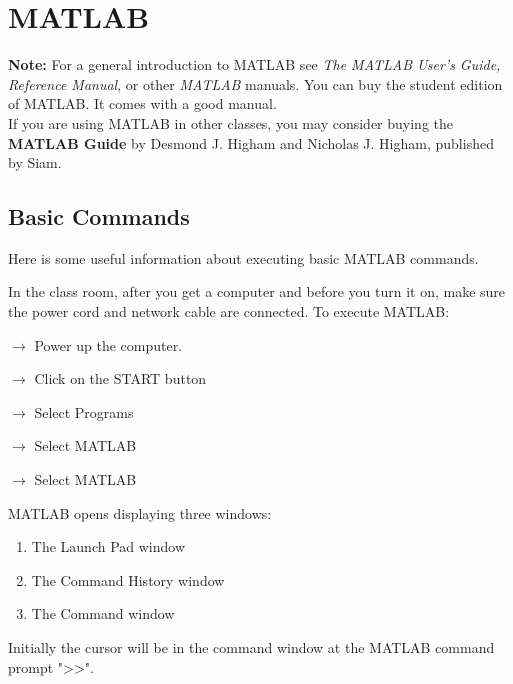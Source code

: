 
\newcommand{\mlc}[1] {\texttt{>> #1 }}
\newcommand{\ttt}[1]{\texttt{#1}}

\section{MATLAB} 

\textbf{Note:} For a general introduction to MATLAB see \textit{The
  MATLAB User's Guide, Reference Manual}, or other \textit{MATLAB}
manuals.  You can buy the student edition of MATLAB.  It comes with a
good manual. \\


If you are using MATLAB in other classes, you may consider buying the 
\textbf{MATLAB Guide} by Desmond J. Higham and Nicholas J. Higham, published
by Siam.\\ 
  

\subsection{Basic Commands}

Here is some useful information about executing basic MATLAB commands.

In the class room, after you get a computer and before you turn it on, make sure 
the power cord and network cable are connected.  To execute MATLAB:

$\rightarrow$  Power up the computer.

\hspace{.2in}$\rightarrow$  Click on the START button

\hspace{.4in}$\rightarrow$  Select Programs

\hspace{.6in}$\rightarrow$  Select MATLAB

\hspace{.8in}$\rightarrow$  Select MATLAB

MATLAB opens displaying three windows:
\begin{enumerate}
  \item The Launch Pad window
  \item The Command History window
  \item The Command window
\end{enumerate}

Initially the cursor will be in the command window at the MATLAB command prompt
"$\ttt{>>}$".
\vspace{0.25in}

